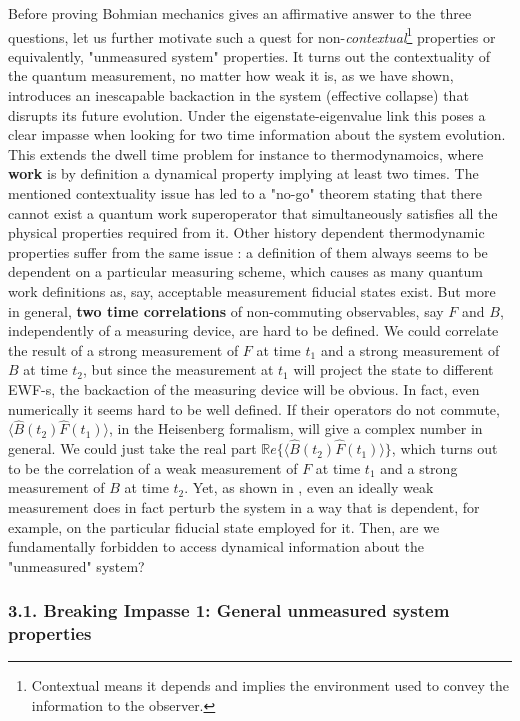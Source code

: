 \documentclass[11pt, a4paper]{article} %
\begin{document}
Before proving Bohmian mechanics gives an affirmative answer to the three questions, let us further motivate such a quest for non-{\em contextual}\footnote{Contextual means it depends and implies the environment used to convey the information to the observer.} properties or equivalently, "unmeasured system" properties. It turns out the contextuality of the quantum measurement, no matter how weak it is, as we have shown, introduces an inescapable backaction in the system (effective collapse) that disrupts its future evolution. Under the eigenstate-eigenvalue link this poses a clear impasse when looking for two time information about the system evolution. This extends the dwell time problem for instance to thermodynamoics, where {\bf work} is by definition a dynamical property implying at least two times. The mentioned contextuality issue has led to a "no-go" theorem \cite{nogo} stating that there cannot exist a quantum work superoperator that simultaneously satisfies all the physical properties required from it. Other history dependent thermodynamic properties suffer from the same issue \cite{workPb1, workPb2}: a definition of them always seems to be dependent on a particular measuring scheme, which causes as many quantum work definitions as, say, acceptable measurement fiducial states exist. But more in general, {\bf two time correlations} of non-commuting observables, say $F$ and $B$, independently of a measuring device, are hard to be defined. We could correlate the result of a strong measurement of $F$ at time $t_1$ and a strong measurement of $B$ at time $t_2$, but since the measurement at $t_1$ will project the state to different EWF-s, the backaction of the measuring device will be obvious. In fact, even numerically it seems hard to be well defined. If their operators do not commute, $\langle \hat{B}(t_2)\hat{F}(t_1)\rangle$, in the Heisenberg formalism, will give a complex number in general. We could just take the real part $\mathbb{R}e \big\{\langle \hat{B}(t_2)\hat{F}(t_1)\rangle\big\}$, which turns out to be the correlation of a weak measurement \cite{Weak} of $F$ at time $t_1$ and a strong measurement of $B$ at time $t_2$. Yet, as shown in \cite{spin}, even an ideally weak measurement does in fact perturb the system in a way that is dependent, for example, on the particular fiducial state employed for it.  Then, are we fundamentally forbidden to access dynamical information about the "unmeasured" system? \vspace{-0.15cm}


\subsubsection*{3.1. Breaking Impasse 1: General unmeasured system properties }\vspace{-0.15cm}
\end{document}
